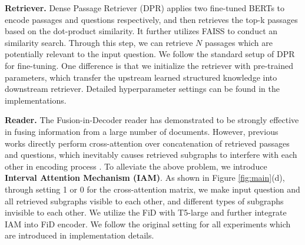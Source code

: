 \documentclass[sigconf,natbib=true,anonymous=False]{acmart}
\begin{document}
\textbf{Retriever.} Dense Passage Retriever (DPR) applies two fine-tuned BERTs \cite{devlin2018bert} to encode passages and questions respectively, and then retrieves the top-k passages based on the dot-product similarity. It further utilizes FAISS \cite{johnson2019billion} to conduct an similarity search. Through this step, we can retrieve $N$ passages which are potentially relevant to the input question. We follow the standard setup of DPR for fine-tuning. One difference is that we initialize the retriever with pre-trained parameters, which transfer the upstream learned structured knowledge into downstream retriever. Detailed hyperparameter settings can be found in the implementations.









\textbf{Reader.} The Fusion-in-Decoder\cite{izacard2020leveraging} reader has demonstrated to be strongly effective in fusing information from a large number of documents. However, previous works directly perform cross-attention over concatenation of retrieved passages and questions, which inevitably causes retrieved subgraphs to interfere with each other in encoding process \cite{de2022fido}. To alleviate the above problem, we introduce \textbf{Interval Attention Mechanism (IAM)}. As shown in Figure \ref{fig:main}(d), through setting 1 or 0 for the cross-attention matrix, we make input question and all retrieved subgraphs visible to each other, and different types of subgraphs invisible to each other. We utilize the FiD with T5-large \cite{raffel2020exploring} and further integrate IAM into FiD encoder. We follow the original setting for all experiments which are introduced in implementation details.
\end{document}
